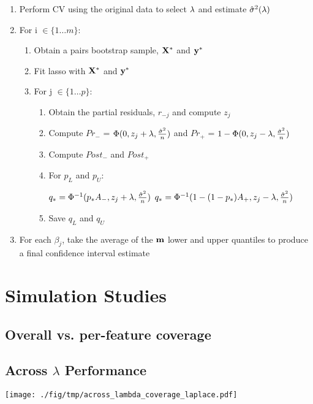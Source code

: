 \begin{enumerate}
\item Perform CV using the original data to select $\lambda$ and estimate $\hat{\sigma}^2(\lambda)$
\item For i $\in \lbrace 1 \ldots m \rbrace$:
\begin{enumerate}
\item Obtain a pairs bootstrap sample, $\mathbf{X}^*$ and $\mathbf{y}^*$
\item Fit lasso with $\mathbf{X}^*$ and $\mathbf{y}^*$
\item For j $\in \lbrace 1 \ldots p \rbrace$:
	\begin{enumerate}
	\item Obtain the partial residuals, $r_{-j}$ and compute $z_j$
	\item Compute $Pr_{-}$ = $\Phi(0, z_j + \lambda, \frac{\hat{\sigma}^2}{n})$ and $Pr_{+}$ = $1 - \Phi(0, z_j - \lambda, \frac{\hat{\sigma}^2}{n})$
	\item Compute $Post_-$ and $Post_+$
	\item For $p_L$ and $p_U$:
	\begin{algorithmic}
			\State $q_* = \Phi^{-1}(p_* A_{-}, z_j + \lambda, \frac{\hat{\sigma}^2}{n})$
		\Else
			\State $q_* = \Phi^{-1}(1 - (1 - p_*)A_{+}, z_j - \lambda, \frac{\hat{\sigma}^2}{n})$
		\EndIf
	\end{algorithmic}
	\item Save $q_L$ and $q_U$
	\end{enumerate}
\end{enumerate}
\item For each $\beta_j$, take the average of the $\mathbf{m}$ lower and upper quantiles to produce a final confidence interval estimate
\end{enumerate}

\section{Simulation Studies}

\subsection{Overall vs. per-feature coverage}

\subsection{Across \texorpdfstring{$\lambda$}{lambda} Performance}
\texttt{[image: ./fig/tmp/across\_lambda\_coverage\_laplace.pdf]}

